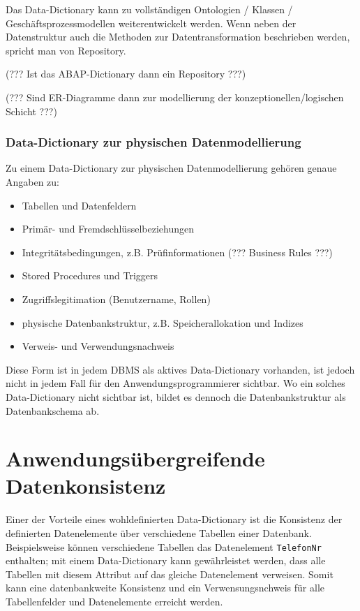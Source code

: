 \documentclass{scrbook}
\begin{document}
Das Data-Dictionary kann zu vollständigen Ontologien / Klassen / Geschäftsprozessmodellen weiterentwickelt
werden. Wenn neben der Datenstruktur auch die Methoden zur Datentransformation beschrieben werden,
spricht man von Repository.

(??? Ist das ABAP-Dictionary dann ein Repository ???)

(??? Sind ER-Diagramme dann zur modellierung der konzeptionellen/logischen Schicht ???)

\subsubsection{Data-Dictionary zur physischen Datenmodellierung}

Zu einem Data-Dictionary zur physischen Datenmodellierung gehören genaue Angaben zu:
\begin{itemize}
\item Tabellen und Datenfeldern
\item Primär- und Fremdschlüsselbeziehungen
\item Integritätsbedingungen, z.B. Prüfinformationen (??? Business Rules ???)
\item Stored Procedures und Triggers 
\item Zugriffslegitimation (Benutzername, Rollen)
\item physische Datenbankstruktur, z.B. Speicherallokation und Indizes
\item Verweis- und Verwendungsnachweis
\end{itemize}

Diese Form ist in jedem DBMS als aktives Data-Dictionary vorhanden, 
ist jedoch nicht in jedem Fall für den Anwendungsprogrammierer sichtbar.
Wo ein solches Data-Dictionary nicht sichtbar ist, bildet es dennoch die 
Datenbankstruktur als Datenbankschema ab.


\section{Anwendungsübergreifende Datenkonsistenz}

Einer der Vorteile eines wohldefinierten Data-Dictionary ist die Konsistenz der definierten Datenelemente
über verschiedene Tabellen einer Datenbank.
Beispielsweise können verschiedene Tabellen das Datenelement \lstinline{TelefonNr} enthalten;
mit einem Data-Dictionary kann gewährleistet werden, dass alle Tabellen mit diesem Attribut
auf das gleiche Datenelement verweisen.
Somit kann eine datenbankweite Konsistenz und ein Verwensungsnchweis für alle Tabellenfelder 
und Datenelemente erreicht werden.
\end{document}
